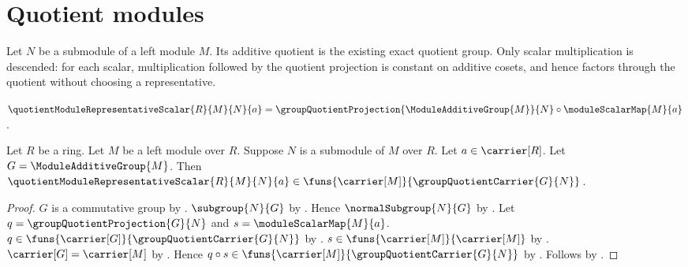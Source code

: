 


\section{Quotient modules}

Let $N$ be a submodule of a left module $M$.  Its additive quotient is the
existing exact quotient group.  Only scalar multiplication is descended: for
each scalar, multiplication followed by the quotient projection is constant
on additive cosets, and hence factors through the quotient without choosing a
representative.

\begin{definition}\label{quotient_module_representative_scalar}
    $\quotientModuleRepresentativeScalar{R}{M}{N}{a}
        =\groupQuotientProjection{\ModuleAdditiveGroup{M}}{N}
            \circ\moduleScalarMap{M}{a}$.
\end{definition}

\begin{proposition}\label{quotient_module_representative_scalar_type}
    Let $R$ be a ring.
    Let $M$ be a left module over $R$.
    Suppose $N$ is a submodule of $M$ over $R$.
    Let $a\in\carrier[R]$.
    Let $G=\ModuleAdditiveGroup{M}$.
    Then
        $\quotientModuleRepresentativeScalar{R}{M}{N}{a}\in
            \funs{\carrier[M]}{\groupQuotientCarrier{G}{N}}$.
\end{proposition}
\begin{proof}
    $G$ is a commutative group by
        .
    $\subgroup{N}{G}$ by .
    Hence $\normalSubgroup{N}{G}$ by
        .
    Let $q=\groupQuotientProjection{G}{N}$ and
        $s=\moduleScalarMap{M}{a}$.
    $q\in\funs{\carrier[G]}{\groupQuotientCarrier{G}{N}}$ by
        .
    $s\in\funs{\carrier[M]}{\carrier[M]}$ by
        .
    $\carrier[G]=\carrier[M]$ by
        .
    Hence $q\circ s\in
        \funs{\carrier[M]}{\groupQuotientCarrier{G}{N}}$ by
        .
    Follows by .
\end{proof}


